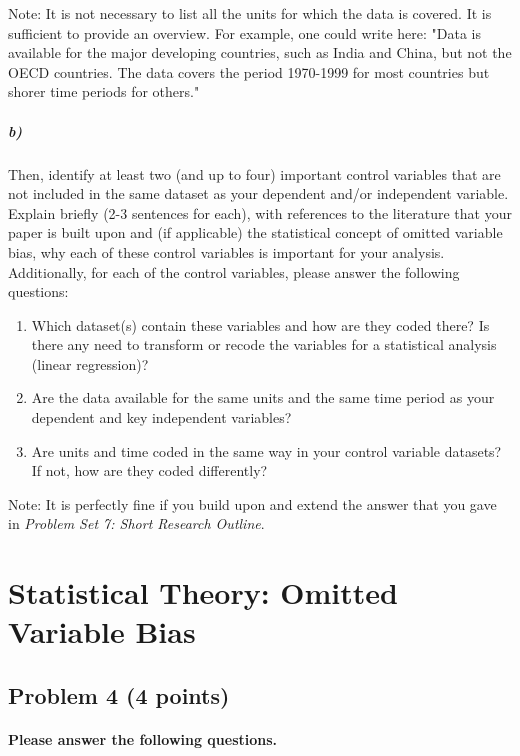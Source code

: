 \documentclass[12pt]{article}
\begin{document}
Note: It is not necessary to list all the units for which the data is covered. It is sufficient to provide an overview. For example, one could write here: "Data is available for the major developing countries, such as India and China, but not the OECD countries. The data covers the period 1970-1999 for most countries but shorer time periods for others."

\subparagraph{b)} Then, identify at least two (and up to four) important control variables that are not included in the same dataset as your dependent and/or independent variable. Explain briefly (2-3 sentences for each), with references to the literature that your paper is built upon and (if applicable) the statistical concept of omitted variable bias, why each of these control variables is important for your analysis. Additionally, for each of the control variables, please answer the following questions:

\begin{enumerate}
	\item Which dataset(s) contain these variables and how are they coded there? Is there any need to transform or recode the variables for a statistical analysis (linear regression)?
	\item Are the data available for the same units and the same time period as your dependent and key independent variables?
	\item Are units and time coded in the same way in your control variable datasets? If not, how are they coded differently?
\end{enumerate}

Note: It is perfectly fine if you build upon and extend the answer that you gave in \textit{Problem Set 7: Short Research Outline}.



\section*{Statistical Theory: Omitted Variable Bias}

\subsection*{Problem 4 (4 points)}

\paragraph{Please answer the following questions.}
\end{document}
